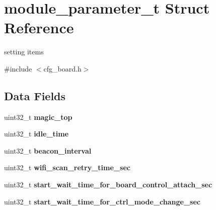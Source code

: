 \hypertarget{structmodule__parameter__t}{}\section{module\+\_\+parameter\+\_\+t Struct Reference}
\label{structmodule__parameter__t}


setting items  




{\ttfamily \#include $<$cfg\+\_\+board.\+h$>$}

\subsection*{Data Fields}
\begin{DoxyCompactItemize}
\item 
\mbox{\label{structmodule__parameter__t_a028c299066f62652fdb9306fd1dd3a35}} 
uint32\+\_\+t {\bfseries magic\+\_\+top}
\item 
\mbox{\label{structmodule__parameter__t_a2ddf1534c59608575af91af46957a364}} 
uint32\+\_\+t {\bfseries idle\+\_\+time}
\item 
\mbox{\label{structmodule__parameter__t_ab2ecf8b42f312209240d246f8d2a3d10}} 
uint32\+\_\+t {\bfseries beacon\+\_\+interval}
\item 
\mbox{\label{structmodule__parameter__t_a77edde7e64a170a653e5bc633a2ef5b6}} 
uint32\+\_\+t {\bfseries wifi\+\_\+scan\+\_\+retry\+\_\+time\+\_\+sec}
\item 
\mbox{\label{structmodule__parameter__t_ab1c35f97a75f0fe70461603d7b13a398}} 
uint32\+\_\+t {\bfseries start\+\_\+wait\+\_\+time\+\_\+for\+\_\+board\+\_\+control\+\_\+attach\+\_\+sec}
\item 
\mbox{\label{structmodule__parameter__t_a1f8b1b460d4298e56d406fdc3b0f7dc5}} 
uint32\+\_\+t {\bfseries start\+\_\+wait\+\_\+time\+\_\+for\+\_\+ctrl\+\_\+mode\+\_\+change\+\_\+sec}
\item 
\mbox{\label{structmodule__parameter__t_a23d7eec3feef4fcf23f1d8ac5aa699cf}} 

\end{DoxyCompactItemize}
